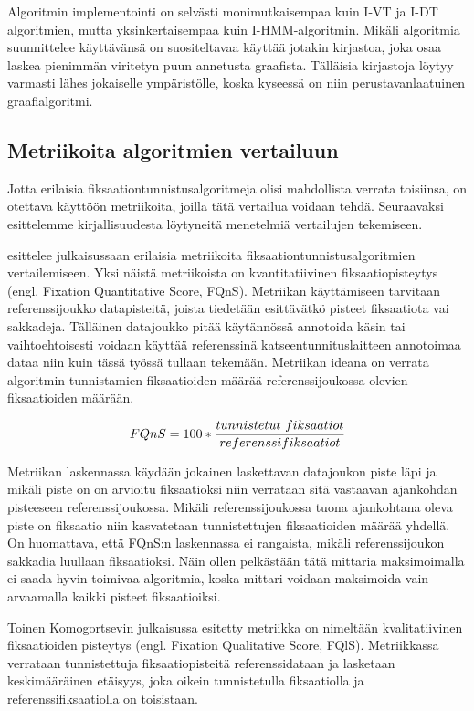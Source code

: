 Algoritmin implementointi on selvästi monimutkaisempaa kuin I-VT ja I-DT algoritmien, mutta yksinkertaisempaa kuin I-HMM-algoritmin. Mikäli algoritmia suunnittelee käyttävänsä on suositeltavaa käyttää jotakin kirjastoa, joka osaa laskea pienimmän viritetyn puun annetusta graafista. Tälläisia kirjastoja löytyy varmasti lähes jokaiselle ympäristölle, koska kyseessä on niin perustavanlaatuinen graafialgoritmi.

\subsection{Metriikoita algoritmien vertailuun}
Jotta erilaisia fiksaationtunnistusalgoritmeja olisi mahdollista verrata toisiinsa, on otettava käyttöön metriikoita, joilla tätä vertailua voidaan tehdä. Seuraavaksi esittelemme kirjallisuudesta löytyneitä menetelmiä vertailujen tekemiseen.

\citet[s. 4]{komogortsev2010} esittelee julkaisussaan erilaisia metriikoita fiksaationtunnistusalgoritmien vertailemiseen. Yksi näistä metriikoista on kvantitatiivinen fiksaatiopisteytys (engl. Fixation Quantitative Score, FQnS). Metriikan käyttämiseen tarvitaan referenssijoukko datapisteitä, joista tiedetään esittävätkö pisteet fiksaatiota vai sakkadeja. Tälläinen datajoukko pitää käytännössä annotoida käsin tai vaihtoehtoisesti voidaan käyttää referenssinä katseentunnituslaitteen annotoimaa dataa niin kuin tässä työssä tullaan tekemään. Metriikan ideana on verrata algoritmin tunnistamien fiksaatioiden määrää referenssijoukossa olevien fiksaatioiden määrään.

\[
FQnS = 100 * {{tunnistetut\ fiksaatiot} \over {referenssifiksaatiot}}
\]
 
 Metriikan laskennassa käydään jokainen laskettavan datajoukon piste läpi ja mikäli piste on on arvioitu fiksaatioksi niin verrataan sitä vastaavan ajankohdan pisteeseen referenssijoukossa. Mikäli referenssijoukossa tuona ajankohtana oleva piste on fiksaatio niin kasvatetaan tunnistettujen fiksaatioiden määrää yhdellä. On huomattava, että FQnS:n laskennassa ei rangaista, mikäli referenssijoukon sakkadia luullaan fiksaatioksi. Näin ollen pelkästään tätä mittaria maksimoimalla ei saada hyvin toimivaa algoritmia, koska mittari voidaan maksimoida vain arvaamalla kaikki pisteet fiksaatioiksi.
 
 Toinen Komogortsevin julkaisussa esitetty metriikka on nimeltään kvalitatiivinen fiksaatioiden pisteytys (engl. Fixation Qualitative Score, FQlS). Metriikkassa verrataan tunnistettuja fiksaatiopisteitä referenssidataan ja lasketaan keskimääräinen etäisyys, joka oikein tunnistetulla fiksaatiolla ja referenssifiksaatiolla on toisistaan. 

